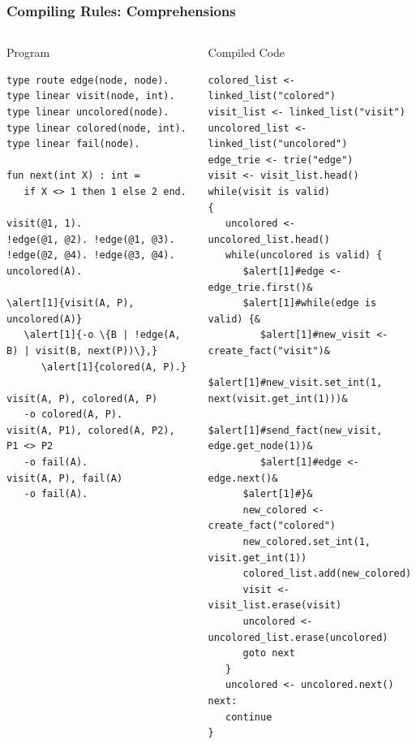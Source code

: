 \documentclass{beamer}
\let\oldalert\alert
\renewcommand{\alert}[2][]{%
  \if\relax\detokenize{#1}\relax%
    \oldalert{#2}%
  \else
    \oldalert<#1>{#2}%
  \fi}
\begin{document}
\begin{frame}[fragile]
   \frametitle{Compiling Rules: Comprehensions}
   \begin{columns}[t]
     \begin{block}{Program}
       \begin{Verbatim}[fontsize=\tiny,commandchars=\\\{\},frame=single]
type route edge(node, node).
type linear visit(node, int).
type linear uncolored(node).
type linear colored(node, int).
type linear fail(node).

fun next(int X) : int =
   if X <> 1 then 1 else 2 end.

visit(@1, 1).
!edge(@1, @2). !edge(@1, @3).
!edge(@2, @4). !edge(@3, @4).
uncolored(A).

\alert[1]{visit(A, P), uncolored(A)}
   \alert[1]{-o \{B | !edge(A, B) | visit(B, next(P))\},}
      \alert[1]{colored(A, P).}

visit(A, P), colored(A, P)
   -o colored(A, P).
visit(A, P1), colored(A, P2), P1 <> P2
   -o fail(A).
visit(A, P), fail(A)
   -o fail(A).
\end{Verbatim}
     \end{block}
   \begin{block}{Compiled Code}
\begin{Verbatim}[fontsize=\tiny,frame=single,commandchars=\$\#\&]
colored_list <- linked_list("colored")
visit_list <- linked_list("visit")
uncolored_list <- linked_list("uncolored")
edge_trie <- trie("edge")
visit <- visit_list.head()
while(visit is valid)
{
   uncolored <- uncolored_list.head()
   while(uncolored is valid) {
      $alert[1]#edge <- edge_trie.first()&
      $alert[1]#while(edge is valid) {&
         $alert[1]#new_visit <- create_fact("visit")&
         $alert[1]#new_visit.set_int(1, next(visit.get_int(1)))&
         $alert[1]#send_fact(new_visit, edge.get_node(1))&
         $alert[1]#edge <- edge.next()&
      $alert[1]#}&
      new_colored <- create_fact("colored")
      new_colored.set_int(1, visit.get_int(1))
      colored_list.add(new_colored)
      visit <- visit_list.erase(visit)
      uncolored <- uncolored_list.erase(uncolored)
      goto next
   }
   uncolored <- uncolored.next()
next:
   continue
}
\end{Verbatim}
   \end{block}
   \end{columns}
\end{frame}
\end{document}
